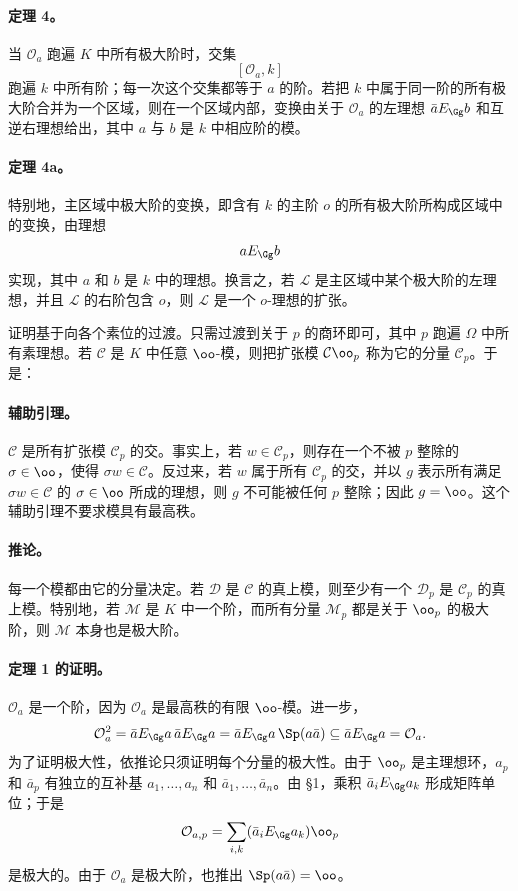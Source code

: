 \paragraph{定理 4。}
当 \(\mathcal O_a\) 跑遍 \(K\) 中所有极大阶时，交集
\[
        [\mathcal O_a,k]
\]
跑遍 \(k\) 中所有阶；每一次这个交集都等于 \(a\) 的阶。若把 \(k\) 中属于同一阶的所有极大阶合并为一个区域，则在一个区域内部，变换由关于 \(\mathcal O_a\) 的左理想 \(\bar aE_\Gg b\) 和互逆右理想给出，其中 \(a\) 与 \(b\) 是 \(k\) 中相应阶的模。

\paragraph{定理 4a。}
特别地，主区域中极大阶的变换，即含有 \(k\) 的主阶 \(o\) 的所有极大阶所构成区域中的变换，由理想
\[
        aE_\Gg b
\]
实现，其中 \(a\) 和 \(b\) 是 \(k\) 中的理想。换言之，若 \(\mathcal L\) 是主区域中某个极大阶的左理想，并且 \(\mathcal L\) 的右阶包含 \(o\)，则 \(\mathcal L\) 是一个 \(o\)-理想的扩张。

证明基于向各个素位的过渡。只需过渡到关于 \(p\) 的商环即可，其中 \(p\) 跑遍 \(\Omega\) 中所有素理想。若 \(\mathcal C\) 是 \(K\) 中任意 \(\oo\)-模，则把扩张模 \(\mathcal C\oo_p\) 称为它的分量 \(\mathcal C_p\)。于是：

\paragraph{辅助引理。}
\(\mathcal C\) 是所有扩张模 \(\mathcal C_p\) 的交。事实上，若 \(w\in\mathcal C_p\)，则存在一个不被 \(p\) 整除的 \(\sigma\in\oo\)，使得 \(\sigma w\in\mathcal C\)。反过来，若 \(w\) 属于所有 \(\mathcal C_p\) 的交，并以 \(g\) 表示所有满足 \(\sigma w\in\mathcal C\) 的 \(\sigma\in\oo\) 所成的理想，则 \(g\) 不可能被任何 \(p\) 整除；因此 \(g=\oo\)。这个辅助引理不要求模具有最高秩。

\paragraph{推论。}
每一个模都由它的分量决定。若 \(\mathcal D\) 是 \(\mathcal C\) 的真上模，则至少有一个 \(\mathcal D_p\) 是 \(\mathcal C_p\) 的真上模。特别地，若 \(\mathcal M\) 是 \(K\) 中一个阶，而所有分量 \(\mathcal M_p\) 都是关于 \(\oo_p\) 的极大阶，则 \(\mathcal M\) 本身也是极大阶。

\paragraph{定理 1 的证明。}
\(\mathcal O_a\) 是一个阶，因为 \(\mathcal O_a\) 是最高秩的有限 \(\oo\)-模。进一步，
\[
        \mathcal O_a^2
        =\bar aE_\Gg a\,\bar aE_\Gg a
        =\bar aE_\Gg a\,\Sp(a\bar a)
        \subseteq \bar aE_\Gg a=\mathcal O_a.
\]
为了证明极大性，依推论只须证明每个分量的极大性。由于 \(\oo_p\) 是主理想环，\(a_p\) 和 \(\bar a_p\) 有独立的互补基 \(a_1,\ldots,a_n\) 和 \(\bar a_1,\ldots,\bar a_n\)。由 §1，乘积 \(\bar a_iE_\Gg a_k\) 形成矩阵单位；于是
\[
        \mathcal O_{a,p}=\sum_{i,k}(\bar a_iE_\Gg a_k)\oo_p
\]
是极大的。由于 \(\mathcal O_a\) 是极大阶，也推出 \(\Sp(a\bar a)=\oo\)。


